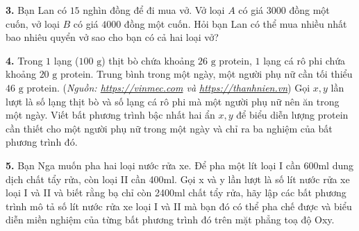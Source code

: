 \documentclass[12pt,a4paper]{extarticle}
\begin{document}
\textbf{3.} Bạn Lan có $15$ nghìn đồng để đi mua vở. Vở loại $A$ có giá $3000$ đồng một cuốn, vở loại $B$ có giá $4000$ đồng một cuốn. Hỏi bạn Lan có thể mua nhiều nhất bao nhiêu quyển vở sao cho bạn có cả hai loại vở?\\
\vspace{1cm}

\textbf{4.} Trong $1$ lạng ($100\text{ g}$) thịt bò chứa khoảng $26\text{ g}$ protein, $1$ lạng cá rô phi chứa khoảng $20\text{ g}$ protein. Trung bình trong một ngày, một người phụ nữ cần tối thiểu $46\text{ g}$ protein. (\textit{Nguồn: \url{https://vinmec.com} và \url{https://thanhnien.vn}}) Gọi $x, y$ lần lượt là số lạng thịt bò và số lạng cá rô phi mà một người phụ nữ nên ăn trong một ngày. Viết bất phương trình bậc nhất hai ẩn $x, y$ để biểu diễn lượng protein cần thiết cho một người phụ nữ trong một ngày và chỉ ra ba nghiệm của bất phương trình đó.\\
\vspace{1cm}

\textbf{5.} Bạn Nga muốn pha hai loại nước rửa xe. Để pha một lít loại I cần 600ml dung dịch chất tẩy rửa, còn loại II cần 400ml. Gọi x và y lần lượt là số lít nước rửa xe loại I và II và biết rằng bạ chỉ còn 2400ml chất tẩy rửa, hãy lập các bất phương trình mô tả số lít nước rửa xe loại I và II mà bạn đó có thể pha chế được và biểu diễn miền nghiệm của từng bất phương trình đó trên mặt phẳng toạ độ Oxy.
\end{document}
